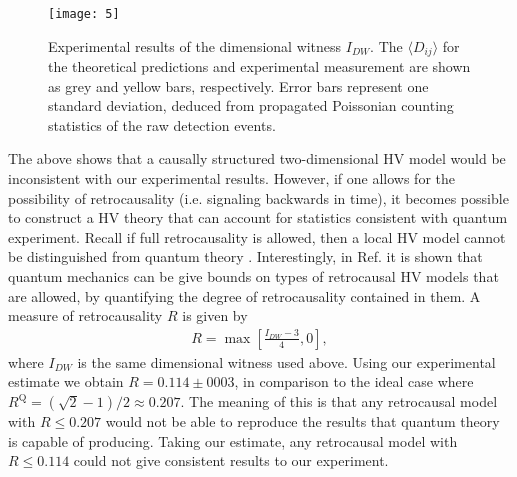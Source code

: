 \documentclass[aps,prl,twocolumn,amsmath,amssymb,nofootinbib,superscriptaddress]{revtex4-1}
\begin{document}
\begin{figure}[t]
\texttt{[image: 5]}
\caption{Experimental results of the dimensional witness $I_{DW}$. The $\langle {D_{ij}}\rangle$ for the theoretical predictions and experimental measurement are shown as grey and yellow bars, respectively. Error bars represent one standard deviation, deduced from propagated Poissonian counting statistics of the raw detection events.} \label{fig:5}
\end{figure}





The above shows that a causally structured two-dimensional HV model would be inconsistent with our experimental results.  However, if one allows for the possibility of retrocausality (i.e. signaling backwards in time), it becomes possible to construct a HV theory that can account for statistics consistent with quantum experiment.  Recall if full retrocausality is allowed, then a local HV model cannot be distinguished from quantum theory \cite{lazarovici2015relativistic}. Interestingly, in Ref. \cite{Chaves2018} it is shown that quantum mechanics can be give bounds on types of retrocausal HV models that are allowed, by quantifying the degree of retrocausality contained in them. A measure of retrocausality $R$ is given by 
%
\begin{align}
R = \max \left[ {\frac{{{I_{DW}} - 3}}{4},0} \right],
\end{align}	
%							
where ${I_{DW}}$ is the same dimensional witness used above. Using our experimental estimate we obtain $ R = 0.114 \pm 0003 $, in comparison to the ideal case where ${R^\text{Q}} = (\sqrt{2} - 1)/2 \approx 0.207$.  The meaning of this is that any retrocausal model with $ R \le 0.207 $ would not be able to reproduce the results that quantum theory is capable of producing.  Taking our estimate,  any retrocausal model with $ R \le 0.114 $ could not give consistent results to our experiment.  


\end{document}
